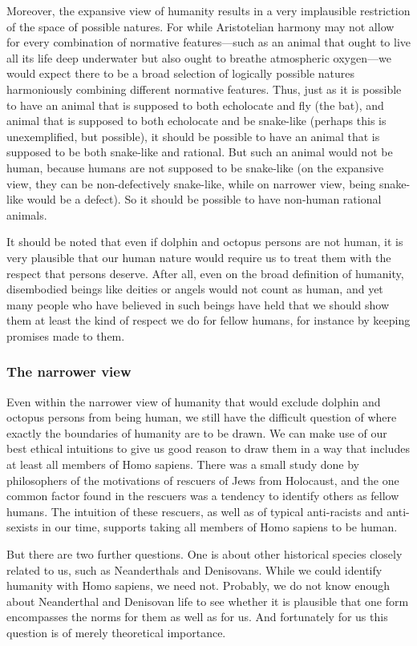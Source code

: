 Moreover, the expansive view of humanity results in a very implausible restriction of the space of possible natures. For while Aristotelian harmony may not
allow for every combination of normative features---such as an animal that ought to live all its life deep underwater but also ought to breathe atmospheric 
oxygen---we would expect there to be a broad selection of logically possible natures harmoniously combining different normative features. Thus, just as it
is possible to have an animal that is supposed to both echolocate and fly (the bat), and animal that is supposed to both echolocate and be snake-like (perhaps
this is unexemplified, but possible), it should
be possible to have an animal that is supposed to be both snake-like and rational. But such an animal would not be human, because humans are not supposed
to be snake-like (on the expansive view, they can be non-defectively snake-like, while on narrower view, being snake-like would be a defect). So it should
be possible to have non-human rational animals.

It should be noted that even if dolphin and octopus persons are not human, it is very plausible that our human nature would require us to treat them with the
respect that persons deserve. After all, even on the broad definition of humanity, disembodied beings like deities or angels would not count as human, and yet
many people who have believed in such beings have held that we should show them at least the kind of respect we do for fellow humans, for instance by keeping
promises made to them.

\subsubsection{The narrower view}
Even within the narrower view of humanity that would exclude dolphin and octopus persons from being human, we still have the difficult question of where exactly the boundaries of humanity are to be drawn. 
We can make use of our best ethical intuitions to give us good reason to draw them in a way that includes at least all 
members of Homo sapiens. There was a small study done by philosophers of the motivations of rescuers of Jews from Holocaust, and the one common
factor found in the rescuers was a tendency to identify others as fellow humans. The intuition of these rescuers, as well as of typical anti-racists and 
anti-sexists in our time, supports taking all members of Homo sapiens to be human. 

But there are two further questions. One is about other historical species closely related to us, such as Neanderthals and Denisovans. While we could
identify humanity with Homo sapiens, we need not. Probably, we do not know enough about Neanderthal and Denisovan life to see whether it is 
plausible that one form encompasses the norms for them as well as for us. And fortunately for us this question is of merely theoretical importance.

